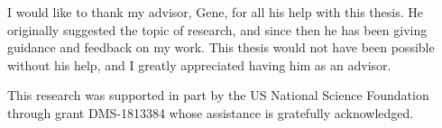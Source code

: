 
I would like to thank my advisor, Gene, for all his help with this thesis. He originally suggested the topic of research, and since then he has been giving guidance and feedback on my work. This thesis would not have been possible without his help, and I greatly appreciated having him as an advisor.





This research was supported in part by the US National Science Foundation through grant DMS-1813384 whose assistance is gratefully acknowledged.



